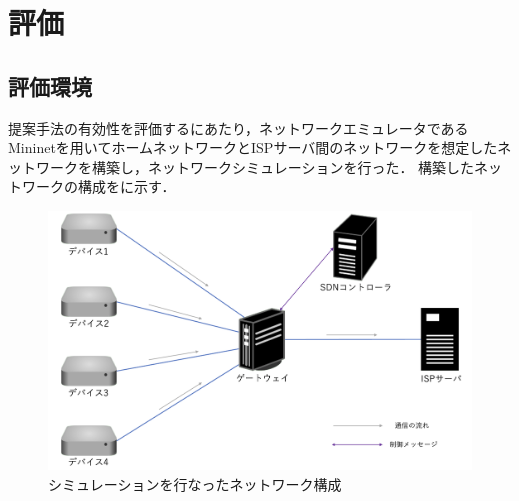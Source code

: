 \documentclass[a4paper,11pt,uplatex]{ujreport}
\begin{document}






\chapter{評価}
\label{chap:評価}

\section{評価環境}
\label{評価環境}

提案手法の有効性を評価するにあたり，ネットワークエミュレータであるMininet\cite{Mininet}を用いてホームネットワークとISPサーバ間のネットワークを想定したネットワークを構築し，ネットワークシミュレーションを行った．
構築したネットワークの構成をに示す．\par

\begin{figure}[!b]
  \centering
  \includegraphics[width=\linewidth]{img/experiment5.png}
  \caption{シミュレーションを行なったネットワーク構成}
  \label{fig:experiment}
\end{figure}
\end{document}
